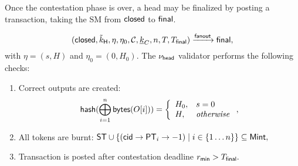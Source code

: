 

Once the contestation phase is over, a head
may be finalized by posting a \mtxFanout{} transaction, taking the SM
from $\mathsf{closed}$ to $\mathsf{final}$.  

$$
   (\mathsf{closed},\tilde{k}_{\mathsf{H}},\eta,\eta_0,\mathcal{C},\underline{k}_C,n,T,T_{\mathsf{final}}) \xrightarrow{\mathsf{fanout}} \mathsf{final},
$$
with $\eta = (s, H)$ and $\eta_0 = (0, H_0).$
The $\nu_\mathsf{head}$ validator performs the following checks:
\begin{enumerate}
  \item Correct outputs are created: 
  $$
  \mathsf{hash}(\bigoplus_{i=1}^n \mathsf{bytes}(O[i])) = 
    \left\{
    \begin{array}{ll}
        H_0, & s = 0 \\
        H, &\mathit{otherwise}
    \end{array}
    \right.,
  $$
  \item All tokens are burnt: 
     $\mathsf{ST} \cup \{(\mathsf{cid} \rightarrow \mathsf{PT}_i \rightarrow -1) \mid i \in \{1\dots n\}\} \subseteq \mathsf{Mint},$
  \item Transaction is posted after contestation deadline $r_{\mathsf{min}} > T_{\mathsf{final}}.$
\end{enumerate}

